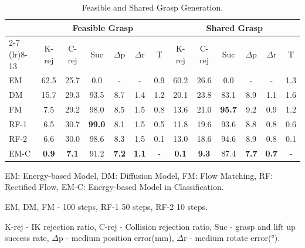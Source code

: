\begin{table}[!htbp]
\setlength{\tabcolsep}{2.pt}
\centering
\caption{Feasible and Shared Grasp Generation.}
\label{tab_generation_task}
\begin{threeparttable}
\begin{tabular}{l|cccccc|cccccc}
\toprule
& \multicolumn{6}{c|}{Feasible Grasp}  
& \multicolumn{6}{c}{Shared Grasp} \\ 
\cmidrule(lr){2-7} \cmidrule(lr){8-13}
& K-rej &C-rej &Suc &$\Delta$p  &$\Delta$r  &T
& K-rej &C-rej &Suc &$\Delta$p  &$\Delta$r  &T  \\
\midrule
EM  & 62.5 &25.7& \phantom{0}0.0 &\phantom{0}- &\phantom{0}- & \phantom{0}0.9 &60.2 &26.6 &\phantom{0}0.0 &\phantom{0}- &\phantom{0}- &\phantom{0}1.3 \\
DM  & 15.7 & 29.3 & 93.5 &\phantom{0}8.7 &\phantom{0}1.4 &\phantom{0}1.2 &20.1 &23.8 &83.1 &\phantom{0}8.9 &\phantom{0}1.1 &\phantom{0}1.6 \\
FM  & \phantom{0}7.5 & 29.2 &98.0 & \phantom{0}8.5 & \phantom{0}1.5 & \phantom{0}0.8 &13.6 &21.0 &\textbf{95.7} &\phantom{0}9.2 &\phantom{0}0.9 &\phantom{0}1.2 \\
RF-1 & \phantom{0}6.5 & 30.7 & \textbf{99.0} & \phantom{0}8.1 & \phantom{0}1.5 & \phantom{0}0.5 &11.8 &19.6 &93.6 &\phantom{0}8.8 &\phantom{0}0.8 &\phantom{0}0.6 \\
RF-2 & \phantom{0}6.6 & 30.0 & 98.6 & \phantom{0}8.3 & \phantom{0}1.5 & \phantom{0}0.1 &13.0 &18.6 &94.6 &\phantom{0}8.9 &\phantom{0}0.8 &\phantom{0}0.1 \\
\midrule
EM-C &\phantom{0}\textbf{0.9} &\phantom{0}\textbf{7.1} &91.2 &\phantom{0}\textbf{7.2} &\phantom{0}\textbf{1.1} &\phantom{0}- 
&\textbf{0.1} &\phantom{0}\textbf{9.3} &87.4 &\phantom{0}\textbf{7.7} &\phantom{0}\textbf{0.7} &\phantom{0}-\\

\bottomrule
\end{tabular}
\begin{tablenotes}
  \item[Note 1] EM: Energy-based Model, DM: Diffusion Model, FM: Flow Matching, RF: Rectified Flow, EM-C: Energy-based Model in Classification.
  \item[Note 2] EM, DM, FM - 100 steps, RF-1 50 steps, RF-2 10 steps.
  \item[Note 3] K-rej - IK rejection ratio, C-rej - Collision rejection ratio, Suc - grasp and lift up success rate, $\Delta$p - medium position error(mm), $\Delta$r - medium rotate error(°).
\end{tablenotes}
\end{threeparttable}
\end{table}

